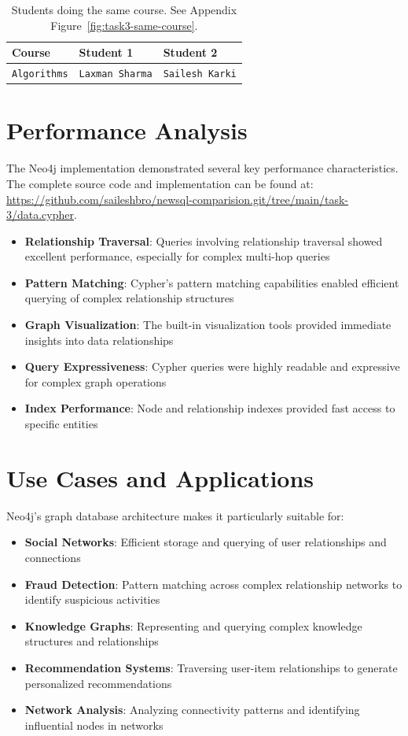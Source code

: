 \begin{table}[H]
  \centering
  \caption{Students doing the same course. See Appendix Figure~\ref{fig:task3-same-course}.}
  \begin{tabular}{lll}
    \textbf{Course} & \textbf{Student 1} & \textbf{Student 2} \\
    \hline
    \texttt{Algorithms} & \texttt{Laxman Sharma} & \texttt{Sailesh Karki} \\
  \end{tabular}
\end{table}

\section{Performance Analysis}

The Neo4j implementation demonstrated several key performance characteristics. The complete source code and implementation can be found at: \url{https://github.com/saileshbro/newsql-comparision.git/tree/main/task-3/data.cypher}.

\begin{itemize}
    \item \textbf{Relationship Traversal}: Queries involving relationship traversal showed excellent performance, especially for complex multi-hop queries
    \item \textbf{Pattern Matching}: Cypher's pattern matching capabilities enabled efficient querying of complex relationship structures
    \item \textbf{Graph Visualization}: The built-in visualization tools provided immediate insights into data relationships
    \item \textbf{Query Expressiveness}: Cypher queries were highly readable and expressive for complex graph operations
    \item \textbf{Index Performance}: Node and relationship indexes provided fast access to specific entities
\end{itemize}

\section{Use Cases and Applications}

Neo4j's graph database architecture makes it particularly suitable for:

\begin{itemize}
    \item \textbf{Social Networks}: Efficient storage and querying of user relationships and connections
    \item \textbf{Fraud Detection}: Pattern matching across complex relationship networks to identify suspicious activities
    \item \textbf{Knowledge Graphs}: Representing and querying complex knowledge structures and relationships
    \item \textbf{Recommendation Systems}: Traversing user-item relationships to generate personalized recommendations
    \item \textbf{Network Analysis}: Analyzing connectivity patterns and identifying influential nodes in networks
\end{itemize}

